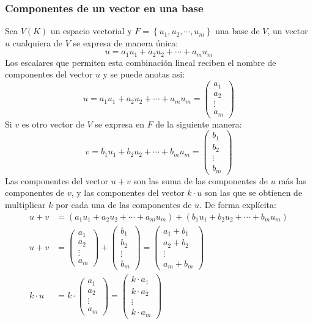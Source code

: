 \subsubsection{Componentes de un vector en una base}

Sea \(V(K)\) un espacio vectorial y \(F = \left\{u_1,u_2,\cdots,u_m\right\}\) una base de \(V\), un vector \(u\) cualquiera de \(V\) se expresa de manera única:
\[
  u = a_1 u_1 + a_2 u_2 + \cdots + a_m u_m
\]
Los escalares que permiten esta combinación lineal reciben el nombre de componentes del vector \(u\) y se puede anotas asi:
\[
  u = a_1 u_1 + a_2 u_2 + \cdots + a_m u_m = \begin{pmatrix}
    a_1 \\ a_2 \\ \vdots \\ a_m
  \end{pmatrix}
\]
Si \(v\) es otro vector de \(V\) se expresa en \(F\) de la siguiente manera:
\[
  v = b_1 u_1 + b_2 u_2 + \cdots + b_m u_m = \begin{pmatrix}
    b_1 \\ b_2 \\ \vdots \\ b_m
  \end{pmatrix}
\]
Las componentes del vector \(u+v\) son las suma de las componentes de \(u\) más las componentes de \(v\), y las componentes del vector \(k\cdot u\) son las que se obtienen de multiplicar \(k\) por cada una de las componentes de \(u\). De forma explícita:
\begin{align*}
  u + v &= (a_1 u_1 + a_2 u_2 + \cdots + a_m u_m) + (b_1 u_1 + b_2 u_2 + \cdots + b_m u_m) \\[3pt]
  u + v &= \begin{pmatrix}
    a_1 \\ a_2 \\ \vdots \\ a_m
  \end{pmatrix} + \begin{pmatrix}
    b_1 \\ b_2 \\ \vdots \\ b_m
  \end{pmatrix} = \begin{pmatrix}
    a_1 + b_1 \\ a_2 + b_2 \\ \vdots \\ a_m + b_m
  \end{pmatrix} \\[10pt]
  k\cdot u &= k \cdot \begin{pmatrix}
    a_1 \\ a_2 \\ \vdots \\ a_m
  \end{pmatrix} = \begin{pmatrix}
    k \cdot a_1 \\ k \cdot a_2 \\ \vdots \\ k \cdot a_m
  \end{pmatrix}
\end{align*}

